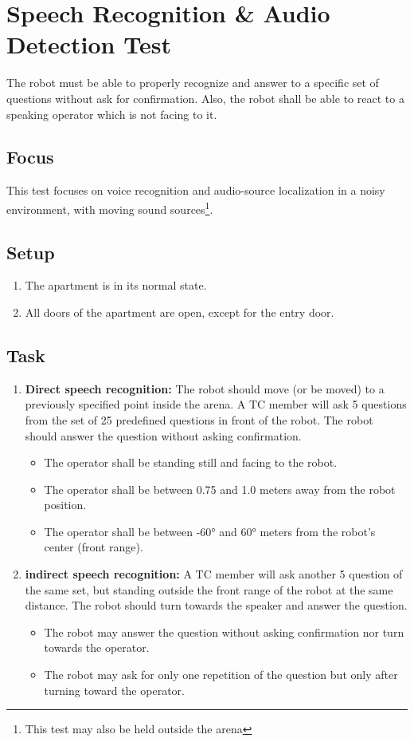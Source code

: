 \section{Speech Recognition \& Audio Detection Test}

The robot must be able to properly recognize and answer to a specific set of questions without ask for confirmation. Also, the robot shall be able to react to a speaking operator which is not facing to it.

\subsection{Focus}

This test focuses on voice recognition and audio-source localization in a noisy environment, with moving sound sources\footnote{This test may also be held outside the arena}.

\subsection{Setup}
\begin{enumerate}
\item The apartment is in its normal state.
\item All doors of the apartment are open, except for the entry door. 
\end{enumerate}

\subsection{Task}

\begin{enumerate}
\item \textbf{Direct speech recognition: } The robot should move (or be moved) to a previously specified point inside the arena. A TC member will ask 5 questions from the set of 25 predefined questions in front of the robot. The robot should answer the question without asking confirmation.
\begin{itemize}
\item The operator shall be standing still and facing to the robot.
\item The operator shall be between 0.75 and 1.0 meters away from the robot position.
\item The operator shall be between -60° and 60° meters from the robot's center (front range).
\end{itemize}
\item \textbf{indirect speech recognition: } A TC member will ask another 5 question of the same set, but standing outside the front range of the robot at the same distance. The robot should turn towards the speaker and answer the question.
\begin{itemize}
\item The robot may answer the question without asking confirmation nor turn towards the operator.
\item The robot may ask for only one repetition of the question but only after turning toward the operator.
\end{itemize}
\end{enumerate}


